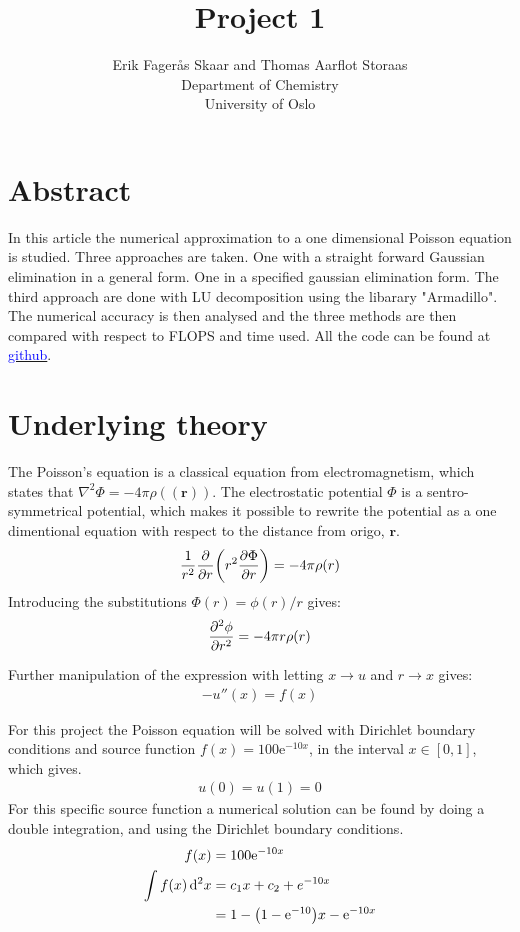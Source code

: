 \documentclass[12pt,norsk,a4paper]{article}
\renewcommand{\exp}[1]{\mathrm{e}^{#1}}
\begin{document}
\author{Erik Fagerås Skaar and Thomas Aarflot Storaas\\
	Department of Chemistry\\
	University of Oslo\\	
}

\title{Project 1}
\maketitle

\section{Abstract}
In this article the numerical approximation to a one dimensional Poisson equation is studied. Three approaches are taken. One with a straight forward Gaussian elimination in a general form. One in a specified gaussian elimination form. The third approach are done with LU decomposition using the libarary "Armadillo". The numerical accuracy is then analysed and the three methods are then compared with respect to FLOPS and time used. All the code can be found at \href{https://github.com/erikfsk/Project-1}{\textcolor{blue}{github}}. %


\section{Underlying theory}

The Poisson's equation is a classical equation from electromagnetism, which states that $\nabla^2\Phi=-4\pi\rho(\mathbf{(r)})$. The electrostatic potential $\Phi$ is a sentro- symmetrical potential, which makes it possible to rewrite the potential as a one dimentional equation with respect to the distance from origo, $\mathbf{r}$.
\begin{align*}
	\frac{1}{r^2}\pdv{r}\qty(r^2 \pdv{\Phi}{r})=-4\pi\rho(r)
\end{align*}
Introducing the substitutions $\Phi(r)=\phi(r)/r$ gives:
\begin{align}
	\pdv[2]{\phi}{r}=-4\pi r \rho(r)
\end{align}

Further manipulation of the expression with letting $x\to  u$ and $r\to x$ gives:
\begin{align*}
	-u''(x)=f(x)
\end{align*}

For this project the Poisson equation will be solved with Dirichlet boundary conditions and source function $f(x)=100\exp{-10x}$, in the interval $x\in[0,1]$, which gives.
\begin{align}
	u(0)=u(1)=0
\end{align}\label{2}
For this specific source function a numerical solution can be found by doing a double integration, and using the Dirichlet boundary conditions. 
\begin{align*}
	f(x)&=100\exp{-10x}\\
	\int f(x)\dd[2]{x}&=c_1x+c_2 + e^{-10 x}\\
	&=1-\qty(1-\exp{-10})x-\exp{-10x}
\end{align*}
\end{document}
